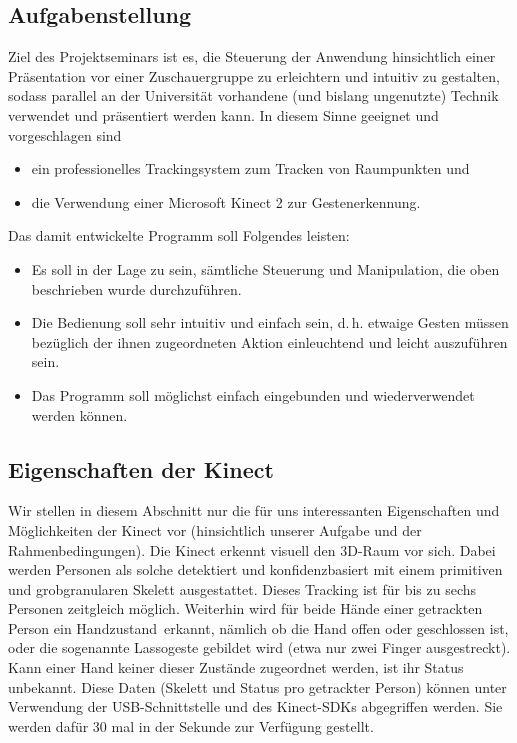 \documentclass[11pt,a4paper]{scrartcl}
\begin{document}
	\subsection{Aufgabenstellung}
	Ziel des Projektseminars ist es, die Steuerung der Anwendung hinsichtlich einer Präsentation vor einer Zuschauergruppe zu erleichtern und intuitiv zu gestalten, sodass parallel an der Universität vorhandene (und bislang ungenutzte) Technik verwendet und präsentiert werden kann. In diesem Sinne geeignet und vorgeschlagen sind
	\begin{itemize}
		\item ein professionelles Trackingsystem zum Tracken von Raumpunkten und
		\item die Verwendung einer Microsoft Kinect 2 zur Gestenerkennung.
	\end{itemize}\par 
	Das damit entwickelte Programm soll Folgendes leisten:
	\begin{itemize}
		\item Es soll in der Lage zu sein, sämtliche Steuerung und Manipulation, die oben beschrieben wurde durchzuführen.
		\item Die Bedienung soll sehr intuitiv und einfach sein, d.\,h. etwaige Gesten müssen bezüglich der ihnen zugeordneten Aktion einleuchtend und leicht auszuführen sein.
		\item Das Programm soll möglichst einfach eingebunden und wiederverwendet werden können.		
	\end{itemize}
\subsection{Eigenschaften der Kinect} 
	Wir stellen in diesem Abschnitt nur die für uns interessanten Eigenschaften und Möglichkeiten der Kinect vor (hinsichtlich unserer Aufgabe und der Rahmenbedingungen). Die Kinect erkennt visuell den 3D-Raum vor sich. Dabei werden Personen als solche detektiert und konfidenzbasiert mit einem primitiven und grobgranularen Skelett ausgestattet. Dieses Tracking ist für bis zu sechs Personen zeitgleich möglich. Weiterhin wird für beide Hände einer getrackten Person ein \glqq Handzustand\grqq~erkannt, nämlich ob die Hand offen oder geschlossen ist, oder die sogenannte Lassogeste gebildet wird (etwa nur zwei Finger ausgestreckt). Kann einer Hand keiner dieser Zustände zugeordnet werden, ist ihr Status unbekannt. Diese Daten (Skelett und Status pro getrackter Person) können unter Verwendung der USB-Schnittstelle und des Kinect-SDKs abgegriffen werden. Sie werden dafür 30 mal in der Sekunde zur Verfügung gestellt.
\end{document}
